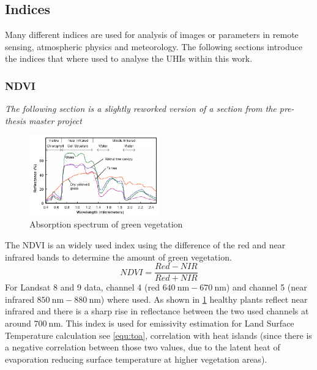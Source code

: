 \subsection{Indices}
Many different indices are used for analysis of images or parameters in remote sensing, atmospheric physics and meteorology.
The following sections introduce the indices that where used to analyse the \glspl{UHI} within this work. 
\subsubsection{NDVI}
\textit{The following section is a slightly reworked version of a section from the pre-thesis master project~\cite{andrae2023}}\\ 
%
\noindent
\begin{figure}[!htbp]
    \centering
    \includegraphics[width=0.5\textwidth]{img/Reflectance-spectra-of-different-types-of-green-vegetation-compared-to-a-spectral.png}
    \caption{Absorption spectrum of green vegetation \autocite[P. 5]{Smith2012}\label{fig:absorbtionVeg}}
\end{figure}
The \gls{NDVI} is an widely used index using the difference of the red and near infrared bands to determine the amount of green vegetation. 
\begin{equation}
    NDVI = \frac{Red-NIR}{Red+NIR}
    \label{equ:ndvi}
\end{equation}
For Landsat 8 and 9 data, channel 4 (red $640\ \text{nm} - 670\ \text{nm}$) and channel 5 (near infrared $850\ \text{nm} - 880\ \text{nm}$) where used.
As shown in \cref{fig:absorbtionVeg} healthy plants reflect near infrared and there is a sharp rise in reflectance between the two used channels at around $700\ \text{nm}$. 
%
This index is used for emissivity estimation for Land Surface Temperature calculation see \cref{equ:toa}, correlation with heat islands (since there is a negative correlation between those two values, due to the latent heat of evaporation reducing surface temperature at higher vegetation areas).

